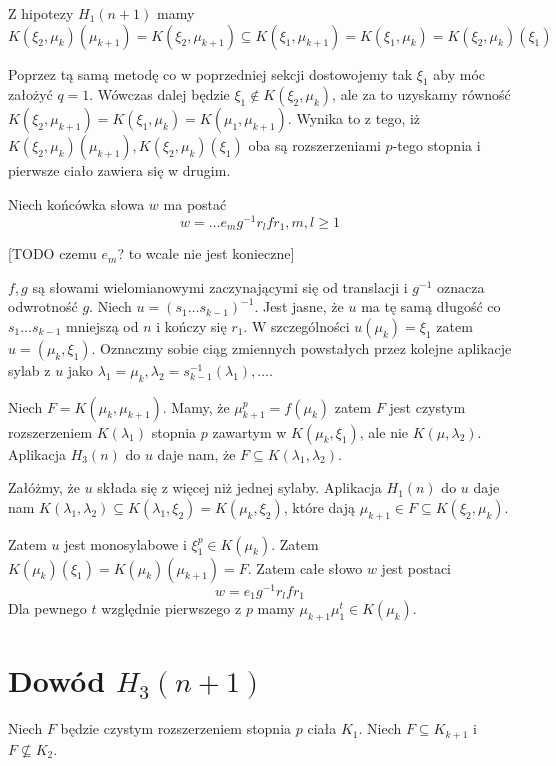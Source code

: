 Z hipotezy $H_1(n+1)$ mamy
\[ 
  K\left(\xi_2, \mu_k\right) \left(\mu_{k+1}\right)
  =
  K\left(\xi_2, \mu_{k+1}\right)
  \subseteq
  K\left(\xi_1, \mu_{k+1}\right)
  =
  K\left(\xi_1, \mu_{k}\right)
  =
  K\left(\xi_2, \mu_{k}\right)\left(\xi_1\right)
\]

Poprzez tą samą metodę co w poprzedniej sekcji dostowojemy tak $\xi_1$ aby móc
założyć $q = 1$. Wówczas dalej będzie $\xi_1 \not \in K\left(\xi_2,
\mu_k\right)$, ale za to uzyskamy równość 
$K\left(\xi_2, \mu_{k+1}\right) 
= K\left(\xi_1, \mu_k\right) 
= K\left(\mu_1, \mu_{k+1}\right)$. Wynika to z tego, iż 
$
K\left(\xi_2, \mu_{k}\right) \left(\mu_{k+1}\right),
K\left(\xi_2, \mu_{k}\right) \left(\xi_{1}\right)$ oba są rozszerzeniami
$p$-tego stopnia i pierwsze ciało zawiera się w drugim.

Niech końcówka słowa $w$ ma postać
\[ w = \ldots e_mg^{-1}r_lfr_1, m,l \geq 1\]

[TODO czemu $e_m$? to wcale nie jest konieczne]

$f, g$ są słowami wielomianowymi zaczynającymi się od translacji i $g^{-1}$
oznacza odwrotność $g$. Niech $u = \left(s_1 \ldots s_{k-1}\right)^{-1}$. Jest
jasne, że $u$ ma tę samą długość co $s_1\ldots s_{k-1}$ mniejszą od $n$ i kończy
się $r_1$. W szczególności $u\left(\mu_k\right) = \xi_1$ zatem $u = \left(\mu_k,
\xi_1\right)$. Oznaczmy sobie ciąg zmiennych powstałych przez kolejne aplikacje
sylab z $u$ jako $\lambda_1 = \mu_k, \lambda_2 =
s_{k-1}^{-1}\left(\lambda_1\right), \ldots$.

Niech $F = K \left(\mu_k, \mu_{k+1}\right)$. Mamy, że 
$\mu_{k+1}^p = f\left(\mu_k\right)$ zatem $F$ jest czystym rozszerzeniem
$K\left(\lambda_1 \right)$ stopnia $p$ zawartym w $K \left( \mu_k, \xi_1
\right)$, ale nie $K \left(\mu, \lambda_2 \right)$. 
Aplikacja $H_3(n)$ do $u$ daje nam, że $F \subseteq K \left( \lambda_1,
\lambda_2 \right)$.

Załóżmy, że $u$ składa się z więcej niż jednej sylaby. Aplikacja $H_1(n)$ do $u$
daje nam 
$K \left( \lambda_1, \lambda_2 \right) \subseteq K \left( \lambda_1, \xi_2
\right) = K \left( \mu_k, \xi_2 \right)$, które dają $\mu_{k+1} \in F \subseteq
K \left( \xi_2, \mu_k \right)$.

Zatem $u$ jest monosylabowe i $\xi_1^p \in K \left( \mu_k\right)$. Zatem 
$K \left( \mu_k \right) \left(\xi_1 \right) = K \left(\mu_k \right)
\left(\mu_{k+1} \right) = F$. Zatem całe słowo $w$ jest postaci
\[w = e_1 g^{-1}r_lfr_1\]
Dla pewnego $t$ względnie pierwszego z $p$ mamy $\mu_{k+1} \mu_1^t \in K \left(
\mu_k \right)$. 


\section{Dowód $H_3(n+1)$}
Niech $F$ będzie czystym rozszerzeniem stopnia $p$ ciała $K_1$. Niech $F
\subseteq K_{k+1}$ i $F \not \subseteq K_2$.


